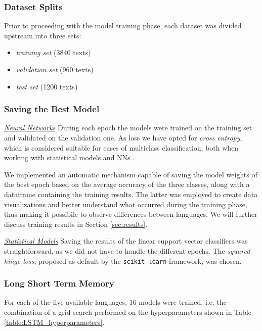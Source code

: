 \documentclass[letterpaper,11pt]{article}
\begin{document}
\subsubsection*{Dataset Splits}

Prior to proceeding with the model training phase, each dataset was divided upstream into three sets: 
\begin{itemize}
  \itemsep-0.42em
  \item \textit{training set} (3840 texts)
  \item \textit{validation set} (960 texts)
  \item \textit{test set} (1200 texts)
\end{itemize}

\subsubsection*{Saving the Best Model}

\underline{\textit{Neural Networks}} During each epoch the models were trained on the training set and validated on the validation one. As loss we have opted for \textit{cross entropy}, which is considered suitable for cases of multiclass classification, both when working with statistical models and NNs \cite{cross_entropy}.

We implemented an automatic mechanism capable of saving the model weights of the best epoch based on the average accuracy of the three classes, along with a dataframe containing the training results. The latter was employed to create data visualizations and better understand what occurred during the training phase, thus making it possibile to observe differences between languages. We will further discuss training results in Section \ref{sec:results}.

\underline{\textit{Statistical Models}} Saving the results of the linear support vector classifiers was straightforward, as we did not have to handle the different epochs. The \textit{squared hinge loss}, proposed as default by the \verb|scikit-learn| framework, was chosen.

\subsubsection*{Long Short Term Memory}

For each of the five available languages, 16 models were trained, i.e. the combination of a grid search performed on the hyperparameters shown in Table \ref{table:LSTM_hyperparameters}.
\end{document}
